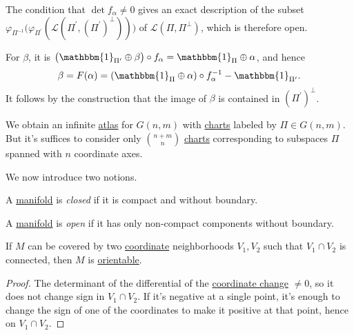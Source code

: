 \begin{note}
	The condition that \(\det f_\alpha \neq 0\) gives an exact description of the subset \(\varphi _{\Pi ^{-1} }\big(\varphi _{\Pi ^\prime }(\mathcal{L} (\Pi ^\prime , (\Pi ^\prime )^{\perp} ))\big)\) of \(\mathcal{L} (\Pi , \Pi ^{\perp} )\), which is therefore open.
\end{note}

For \(\beta \), it is \(\big(\mathbbm{1}_{\Pi ^\prime }\oplus \beta \big) \circ f_\alpha = \mathbbm{1}_{\Pi }\oplus \alpha \), and hence
\[
	\beta = F(\alpha ) = (\mathbbm{1}_{\Pi }\oplus \alpha )\circ f_\alpha ^{-1} - \mathbbm{1}_{\Pi ^\prime } .
\]
It follows by the construction that the image of \(\beta \) is contained in \((\Pi ^\prime )^{\perp} \).

\begin{remark}
	We obtain an infinite \hyperref[def:atlas]{atlas} for \(G(n, m)\) with \hyperref[def:coordinate-chart]{charts} labeled by \(\Pi \in G(n, m)\). But it's suffices to consider only \(\binom{n+m}{n}\) \hyperref[def:coordinate-chart]{charts} corresponding to subspaces \(\Pi \) spanned with \(n\) coordinate axes.
\end{remark}

We now introduce two notions.

\begin{definition}\label{def:closed-manifold}
	A \hyperref[def:topological-manifold]{manifold} is \emph{closed} if it is compact and without boundary.
\end{definition}

\begin{definition}\label{def:open-manifold}
	A \hyperref[def:topological-manifold]{manifold} is \emph{open} if it has only non-compact components without boundary.
\end{definition}

\begin{lemma}
	If \(M\) can be covered by two \hyperref[def:coordinate-chart]{coordinate} neighborhoods \(V_1, V_2\) such that \(V_1 \cap V_2\) is connected, then \(M\) is \hyperref[def:orientable]{orientable}.
\end{lemma}
\begin{proof}
	The determinant of the differential of the \hyperref[def:coordinate-transition]{coordinate change} \(\neq 0\), so it does not change sign in \(V_1 \cap V_2\). If it's negative at a single point, it's enough to change the sign of one of the coordinates to make it positive at that point, hence on \(V_1 \cap V_2\).
\end{proof}

